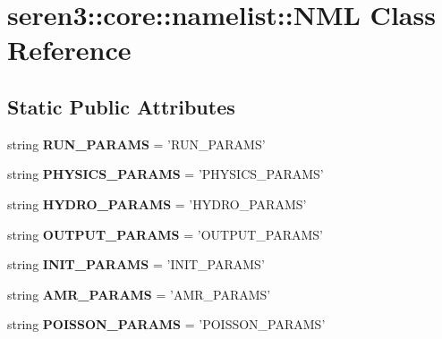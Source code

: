 \hypertarget{classseren3_1_1core_1_1namelist_1_1NML}{
\section{seren3::core::namelist::NML Class Reference}
\label{classseren3_1_1core_1_1namelist_1_1NML}
}
\subsection*{Static Public Attributes}
\begin{DoxyCompactItemize}
\item 
\hypertarget{classseren3_1_1core_1_1namelist_1_1NML_a98315ae5cddd27e18bcf8e05da9abb21}{
string {\bfseries RUN\_\-PARAMS} = 'RUN\_\-PARAMS'}
\label{classseren3_1_1core_1_1namelist_1_1NML_a98315ae5cddd27e18bcf8e05da9abb21}

\item 
\hypertarget{classseren3_1_1core_1_1namelist_1_1NML_aeb1200578cb2e32fff21d5d07de34e28}{
string {\bfseries PHYSICS\_\-PARAMS} = 'PHYSICS\_\-PARAMS'}
\label{classseren3_1_1core_1_1namelist_1_1NML_aeb1200578cb2e32fff21d5d07de34e28}

\item 
\hypertarget{classseren3_1_1core_1_1namelist_1_1NML_ada6a0c84597dc6e81caac24154c8949b}{
string {\bfseries HYDRO\_\-PARAMS} = 'HYDRO\_\-PARAMS'}
\label{classseren3_1_1core_1_1namelist_1_1NML_ada6a0c84597dc6e81caac24154c8949b}

\item 
\hypertarget{classseren3_1_1core_1_1namelist_1_1NML_a701dbc890a7e8a00bf3a6c92dd8c3903}{
string {\bfseries OUTPUT\_\-PARAMS} = 'OUTPUT\_\-PARAMS'}
\label{classseren3_1_1core_1_1namelist_1_1NML_a701dbc890a7e8a00bf3a6c92dd8c3903}

\item 
\hypertarget{classseren3_1_1core_1_1namelist_1_1NML_a056a41c16d2fddfc4fa02b72e5c0242b}{
string {\bfseries INIT\_\-PARAMS} = 'INIT\_\-PARAMS'}
\label{classseren3_1_1core_1_1namelist_1_1NML_a056a41c16d2fddfc4fa02b72e5c0242b}

\item 
\hypertarget{classseren3_1_1core_1_1namelist_1_1NML_a53072babb634099fa1bc9fbacf9ad67c}{
string {\bfseries AMR\_\-PARAMS} = 'AMR\_\-PARAMS'}
\label{classseren3_1_1core_1_1namelist_1_1NML_a53072babb634099fa1bc9fbacf9ad67c}

\item 
\hypertarget{classseren3_1_1core_1_1namelist_1_1NML_a965171f01244161a2181de2985d758eb}{
string {\bfseries POISSON\_\-PARAMS} = 'POISSON\_\-PARAMS'}
\label{classseren3_1_1core_1_1namelist_1_1NML_a965171f01244161a2181de2985d758eb}


\end{DoxyCompactItemize}
